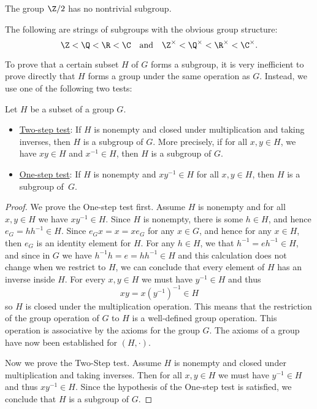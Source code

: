 \begin{example}
	The group $\Z/2$ has no nontrivial subgroup.
\end{example}


\begin{example}
The following are strings of subgroups with the obvious group structure: 
$$\Z < \Q < \R < \C \quad \textrm{and} \quad \Z^\times < \Q^\times < \R^\times < \C^\times.$$
\end{example}


To prove that a certain subset $H$ of $G$ forms a subgroup, it is very inefficient to prove directly that $H$ forms a group under the same operation as $G$. Instead, we use one of the following two tests:

\begin{lemma}
Let $H$ be a subset of a group $G$.
\begin{itemize}[leftmargin=10pt]
	\item \underline{Two-step test}:
If $H$ is nonempty and closed under multiplication and taking inverses, then $H$ is a subgroup of $G$. More precisely, if for all $x, y \in H$, we have $xy \in H$ and $x^{-1} \in H$, then $H$ is a subgroup of $G$.
\item \underline{One-step test}:
If $H$ is nonempty and $xy^{-1} \in H$ for all $x,y \in H$, then $H$ is a subgroup of~$G$.
\end{itemize}
\end{lemma}

\begin{proof} 
We prove the One-step test first.
Assume $H$ is nonempty and for all $x,y \in H$ we have $xy^{-1} \in H$. Since $H$ is nonempty, there is some $h \in H$, and hence $e_G = hh^{-1} \in H$. Since $e_Gx=x=xe_G$ for any $x\in G$, and hence for any $x \in H$, then $e_G$ is an identity element for $H$. For any $h \in H$, we that $h^{-1} = eh^{-1} \in H$, and since in $G$ we have $h^{-1}h = e = hh^{-1} \in H$ and this calculation does not change when we restrict to $H$, we can conclude that every element of $H$ has an inverse inside $H$. For every $x,y \in H$ we must have $y^{-1} \in H$ and thus 
$$xy = x(y^{-1})^{-1} \in H$$ 
so $H$ is closed under the multiplication operation. This means that the restriction of the group operation of $G$ to $H$ is a well-defined group operation. This operation is associative by the axioms for the group $G$. The axioms of a group have now been established for $(H, \cdot)$.

Now we prove the Two-Step test.
Assume $H$ is nonempty and closed under multiplication and taking inverses. Then for all $x,y\in H$ we must have $y^{-1}\in H$ and thus $xy^{-1}\in H$. Since the hypothesis of the One-step test is satisfied, we conclude that $H$ is a subgroup of $G$.
\end{proof}




